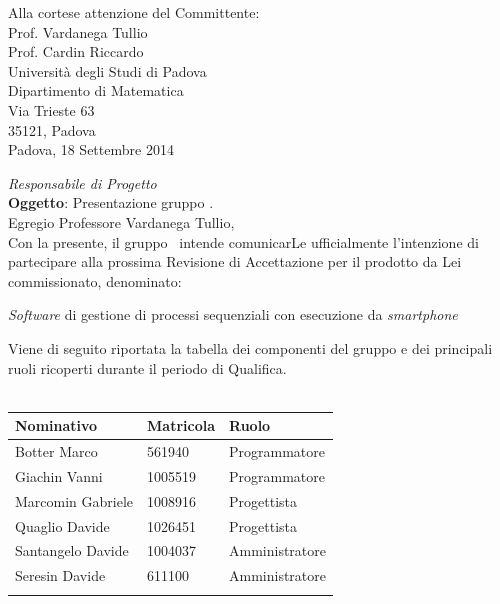 \documentclass[11pt,a4paper]{article}
\begin{document}
\begin{flushright}
Alla cortese attenzione del Committente:\\
Prof. Vardanega Tullio\\
Prof. Cardin Riccardo\\
Università degli Studi di Padova\\
Dipartimento di Matematica\\
Via Trieste 63\\
35121, Padova\\
\bigskip
Padova, 18 Settembre 2014\\
\end{flushright}
\textit{Responsabile di Progetto} \gruppo\\
\medskip
\textbf{Oggetto}: Presentazione gruppo \gruppo.\\
Egregio Professore Vardanega Tullio,\\
Con la presente, il gruppo \gruppo ~intende comunicarLe ufficialmente l'intenzione di partecipare alla prossima Revisione di Accettazione per il prodotto da Lei commissionato, denominato:\\
\begin{center}
\textbf{\progetto} \textit{Software} di gestione di processi sequenziali con esecuzione da \textit{smartphone}\\
\end{center}
Viene di seguito riportata la tabella dei componenti del gruppo \gruppo{} e dei principali ruoli ricoperti durante il periodo di Qualifica.\\
\\
\begin{tabular}{l l l}
\hline
\textbf{Nominativo} & \textbf{Matricola} & \textbf{Ruolo}\\
\hline
Botter Marco & 561940 & Programmatore\\ %
\hline
Giachin Vanni & 1005519 & Programmatore\\ %
\hline
Marcomin Gabriele & 1008916 & Progettista\\ %
\hline
Quaglio Davide & 1026451 &  Progettista\\ %
\hline
Santangelo Davide & 1004037 & Amministratore\\ %
\hline
Seresin Davide & 611100 & Amministratore\\ %
\hline
\\
\end{tabular}\\
\end{document}
